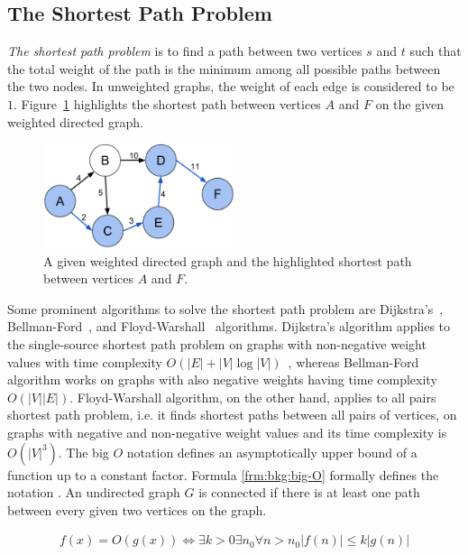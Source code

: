 \subsection{The Shortest Path Problem}
\emph{The shortest path problem} is to find a path between two vertices $s$ and $t$ such that the total weight of the path is the minimum among all possible paths between the two nodes. In unweighted graphs, the weight of each edge is considered to be $1$. Figure~\ref{fig:shortest-path1} highlights the shortest path between vertices $A$ and $F$ on the given weighted directed graph.

\begin{figure}[!ht]
  \centering
  \includegraphics[width=0.5\textwidth]{figs/background/Shortest_path_with_direct_weights}
  \caption{A given weighted directed graph and the highlighted shortest path between vertices $A$ and $F$.}
  \label{fig:shortest-path1}
\end{figure}

Some prominent algorithms to solve the shortest path problem are Dijkstra's~\cite{dijkstra}, Bellman-Ford~\cite{bellman-ford}, and Floyd-Warshall~\cite{floyd-warshall} algorithms. Dijkstra's algorithm applies to the single-source shortest path problem on graphs with non-negative weight values with time complexity $O(|E| + |V| \log |V|)$~\cite{fredman1987fibonacci}, whereas Bellman-Ford algorithm works on graphs with also negative weights having time complexity $O(|V| |E|)$. Floyd-Warshall algorithm, on the other hand, applies to all pairs shortest path problem, i.e. it finds shortest paths between all pairs of vertices, on graphs with negative and non-negative weight values and its time complexity is $O(|V|^3)$. The big $O$ notation defines an asymptotically upper bound of a function up to a constant factor. Formula \ref{frm:bkg:big-O} formally defines the notation \cite{thomas2001introduction}. An undirected graph $G$ is connected if there is at least one path between every given two vertices on the graph.

\begin{align}
  f(x) = O(g(x)) \iff \exists k > 0 \exists n_0 \forall n > n_0 |f(n)| \leq k|g(n)|
  \label{frm:bkg:big-O}
\end{align}


